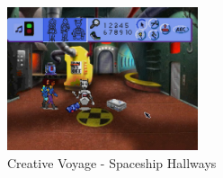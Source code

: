 \begin{figure}[H]
    \centering
    \includegraphics[width=0.5\textwidth]{"./Games/Creative/Images/CreativeVoyageScreenshot2.jpg"}
    \caption{Creative Voyage - Spaceship Hallways}
\end{figure}